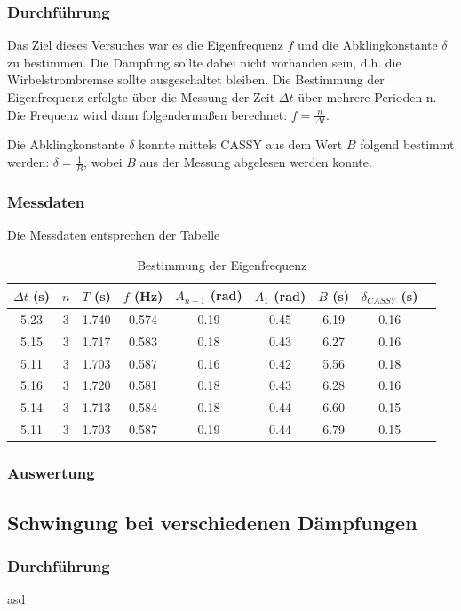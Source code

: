 \documentclass{article}
\begin{document}
\subsubsection{Durchführung}
Das Ziel dieses Versuches war es die Eigenfrequenz $f$ und die Abklingkonstante $\delta$ zu
bestimmen. Die Dämpfung sollte dabei nicht vorhanden sein, d.h. die Wirbelstrombremse
sollte ausgeschaltet bleiben. Die Bestimmung der Eigenfrequenz erfolgte über
die Messung der Zeit $\Delta t$ über mehrere Perioden n. Die Frequenz wird dann
folgendermaßen berechnet: $f = \frac{n}{\Delta t}$.

Die Abklingkonstante $\delta$ konnte mittels CASSY aus dem Wert $B$ folgend
bestimmt werden: $\delta = \frac{1}{B}$, wobei $B$ aus der Messung abgelesen werden konnte.
\subsubsection{Messdaten}
Die Messdaten entsprechen der Tabelle
\begin{table}[!htb]
    \centering
    \begin{tabular}{|c|c|c|c|c|c|c|c|c|}
    \hline
    $\Delta t$ (s) & $n$ & $T$ (s) & $f$ (Hz) & $A_{n+1}$ (rad) & $A_1$ (rad) & $B$ (s) & $\delta_{CASSY}$ (s) \\
    \hline
    5.23 & 3 & 1.740 & 0.574 & 0.19 & 0.45 & 6.19 & 0.16 \\
    5.15 & 3 & 1.717 & 0.583 & 0.18 & 0.43 & 6.27 & 0.16 \\
    5.11 & 3 & 1.703 & 0.587 & 0.16 & 0.42 & 5.56 & 0.18 \\
    5.16 & 3 & 1.720 & 0.581 & 0.18 & 0.43 & 6.28 & 0.16 \\
    5.14 & 3 & 1.713 & 0.584 & 0.18 & 0.44 & 6.60 & 0.15 \\
    5.11 & 3 & 1.703 & 0.587 & 0.19 & 0.44 & 6.79 & 0.15 \\
    \hline
    \end{tabular}
    \caption{Bestimmung der Eigenfrequenz}
    \label{tab:eigenfrequenz}
\end{table}
\subsubsection{Auswertung}

\subsection{Schwingung bei verschiedenen Dämpfungen}
\subsubsection{Durchführung}
asd
\end{document}
